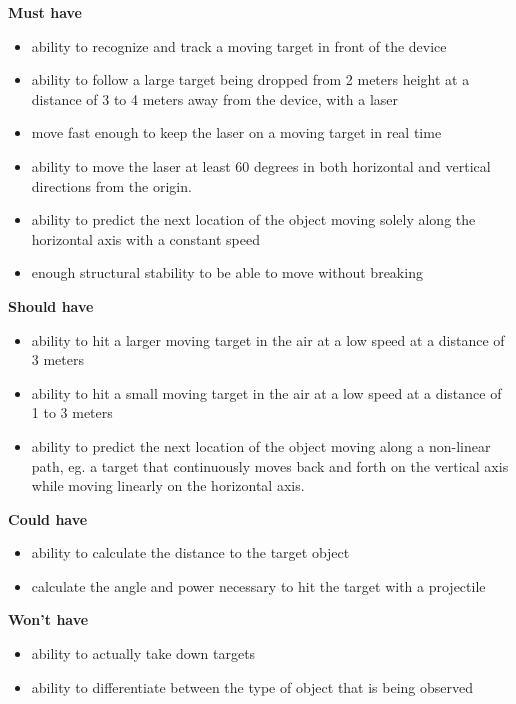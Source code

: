 \textbf{Must have}
\begin{itemize}
	\item ability to recognize and track a moving target in front of the device
	\item ability to follow a large target being dropped from 2 meters height at a distance of 3 to 4 meters away from the device, with a laser
	\item move fast enough to keep the laser on a moving target in real time
	\item ability to move the laser at least 60 degrees in both horizontal and vertical directions from the origin.
	\item ability to predict the next location of the object moving solely along the horizontal axis with a constant speed
	\item enough structural stability to be able to move without breaking
\end{itemize}

\textbf{Should have}
\begin{itemize}
	\item ability to hit a larger moving target in the air at a low speed at a distance of 3 meters
	\item ability to hit a small moving target in the air at a low speed at a distance of 1 to 3 meters
	\item ability to predict the next location of the object moving along a non-linear path, eg{.} a target that continuously moves back and forth on the vertical axis while moving linearly on the horizontal axis.
\end{itemize}

\textbf{Could have}
\begin{itemize}
	\item ability to calculate the distance to the target object
	\item calculate the angle and power necessary to hit the target with a projectile
\end{itemize}

\textbf{Won't have}
\begin{itemize}
	\item ability to actually take down targets
	\item ability to differentiate between the type of object that is being observed
\end{itemize}

